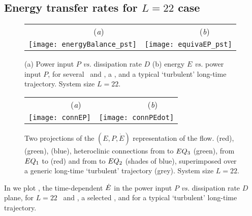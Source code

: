 \subsection{Energy transfer rates for $L=22$ case}
\label{sec:energyL22}

\begin{figure}[t]
\begin{center}
 \begin{tabular}{cc}
        ~~~~~~~~(\textit{a})                        &   ~~~~~~~~(\textit{b}) \\
    \texttt{[image: energyBalance\_pst]}
    & \texttt{[image: equivaEP\_pst]}

  \end{tabular}
\end{center}
\caption{
(a) Power input $P$ {\em vs.}
dissipation rate $D$
(b) energy $E$  {\em vs.}
power input $P$,   for several  \eqva\ and \reqva,
a \rpo, and a typical `turbulent' long-time trajectory.
System size $L=22$.
        }
\label{f:drivedrag1}
\end{figure}

\begin{figure}[t]
\begin{center}
 \begin{tabular}{cc}
        ~~~~~~~~(\textit{a})                        &   ~~~~~~~~(\textit{b}) \\
    \texttt{[image: connEP]}
     & \texttt{[image: connPEdot]}
 \end{tabular}
\end{center}
\caption{
Two projections of the $(E,P,\dot{E})$ representation of the flow.
 (red),  (green),  (blue),
heteroclinic connections from  to $EQ_{3}$ (green),
from $EQ_{1}$ to  (red)
and from  to $EQ_{2}$ (shades of blue), superimposed over
a generic long-time `turbulent' trajectory (grey).
System size $L=22$.
        }
\label{f:drivedragConn}
\end{figure}

In  we plot , the time-dependent
$\dot{E}$ in the power input $P$ {\em vs.}
dissipation rate $D$ plane, for $L=22$ \eqva\ and \reqva,
a selected \rpo, and for a typical `turbulent' long-time
trajectory.

